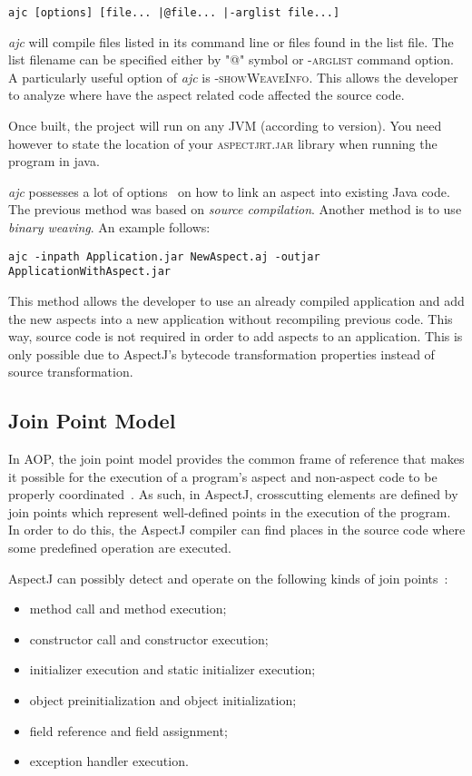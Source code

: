 \documentclass{template}
\begin{document}
\verb!ajc [options] [file... |@file... |-arglist file...]!

\textit{ajc} will compile files listed in its command line or files found in the list file. The list filename can be specified 
either by "@" symbol or \textsc{-arglist} command option. A particularly useful option of \textit{ajc} is \textsc{-showWeaveInfo}. This allows the developer to analyze where have the aspect related code affected the source code. 

Once built, the project will run on any JVM (according to version). You need however to state the location of your \textsc{aspectjrt.jar} library when running the program in java.

\textit{ajc} possesses a lot of options~\cite{ajcsite} on how to link an aspect into existing Java code. The previous method was based on \textit{source compilation}. Another method is to use \textit{binary weaving}. An example follows:

\verb!ajc -inpath Application.jar NewAspect.aj -outjar ApplicationWithAspect.jar!

This method allows the developer to use an already compiled application and add the new aspects into a new application without recompiling previous code. This way, source code is not required in order to add aspects to an application. This is only possible due to AspectJ's bytecode transformation properties instead of source transformation.

\subsection{Join Point Model}

In AOP, the join point model provides the common frame of reference that makes it possible for the execution of a program's aspect and non-aspect code to be properly coordinated~\cite{Kiczales97aspect-orientedprogramming}. As such, in AspectJ, crosscutting elements are defined by join points which represent well-defined points in the execution of the program. In order to do this, the AspectJ compiler can find places in the source code where some predefined operation are executed. 

AspectJ can possibly detect and operate on the following kinds of join points~\cite{Kiselev2002}: 
\begin{itemize}
\item method call and method execution; 
\item constructor call and constructor execution; 
\item initializer execution and static initializer execution; 
\item object preinitialization and object initialization; 
\item field reference and field assignment; 
\item exception handler execution.
\end{itemize}
\end{document}
